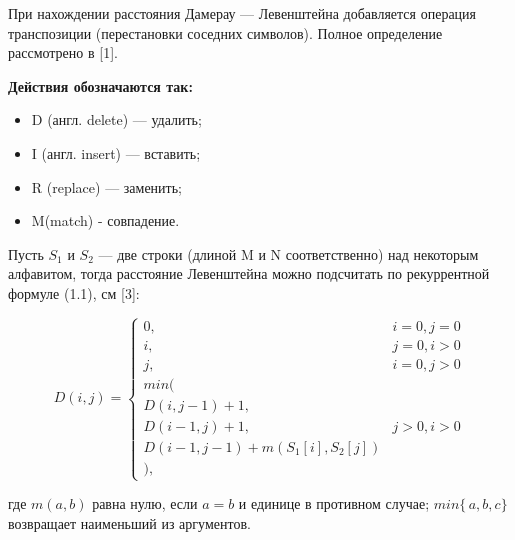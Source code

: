 \documentclass[12pt, a4paper]{report}
\begin{document}
При нахождении расстояния Дамерау — Левенштейна добавляется операция транспозиции (перестановки соседних символов). Полное определение рассмотрено в [1].  
 
\textbf{Действия обозначаются так:} 
\begin{itemize}
  	\item D (англ. delete) — удалить;
	\item I (англ. insert) — вставить;
	\item R (replace) — заменить;
	\item M(match) - совпадение.
\end{itemize}

Пусть $S_{1}$ и $S_{2}$ — две строки (длиной M и N соответственно) над некоторым алфавитом, тогда расстояние Левенштейна можно подсчитать по рекуррентной формуле (1.1), см [3]:


\begin{equation}
D(i,j) = \left\{ \begin{array}{ll}
 0, & \textrm{$i = 0, j = 0$}\\
 i, & \textrm{$j = 0, i > 0$}\\
 j, & \textrm{$i = 0, j > 0$}\\
min(\\
D(i,j-1)+1,\\
D(i-1, j) +1, &\textrm{$j>0, i>0$}\\
D(i-1, j-1) + m(S_{1}[i], S_{2}[j])\\
),
\end{array} \right.
\end{equation}

где $m(a,b)$ равна нулю, если $a=b$ и единице в противном случае; $min\{\,a,b,c\}$ возвращает наименьший из аргументов.
\end{document}
